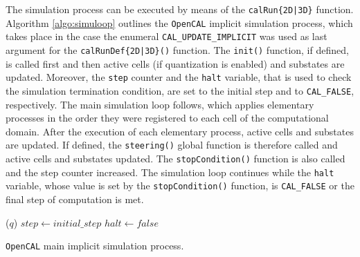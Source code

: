 The simulation process can be executed by means of the
\verb'calRun{2D|3D}' function. Algorithm \ref{algo:simuloop}
outlines the \texttt{OpenCAL} implicit simulation process, which takes place
in the case the enumeral \verb'CAL_UPDATE_IMPLICIT' was used as last
argument for the \verb'calRunDef{2D|3D}()' function. The
\verb'init()' function, if defined, is called first and then active
cells (if quantization is enabled) and substates are
updated. Moreover, the \verb'step' counter and the \verb'halt'
variable, that is used to check the simulation termination
condition, are set to the initial step and to \verb'CAL_FALSE',
respectively. The main simulation loop follows, which applies
elementary processes in the order they were registered to each cell
of the computational domain. After the execution of each elementary
process, active cells and substates are updated. If defined, the
\verb'steering()' global function is therefore called and active
cells and substates updated. The \verb'stopCondition()' function is
also called and the step counter increased. The simulation loop
continues while the \verb'halt' variable, whose value is set by the
\verb'stopCondition()' function, is \verb'CAL_FALSE' or the final
step of computation is met.

\begin{algorithm}
	\DontPrintSemicolon {}
	
	\Init {}
		{ \Update($q$) 
		}
	$step \gets initial\_step$\; $halt \gets false$\;
	\Return\;
	\caption{{\texttt{OpenCAL} main implicit simulation process.}}
	\label{algo:simuloop}
\end{algorithm}

